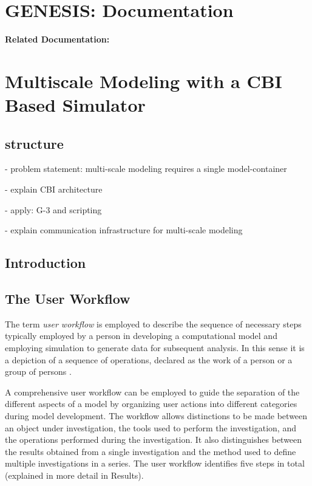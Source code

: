 \documentclass[12pt]{article}
\begin{document}
\section*{GENESIS: Documentation}

{\bf Related Documentation:}

\section*{Multiscale Modeling with a CBI Based Simulator}

\subsection*{structure}

- problem statement: multi-scale modeling requires a single model-container

- explain CBI architecture

- apply: G-3 and scripting

- explain communication infrastructure for multi-scale modeling


\subsection*{Introduction}

\subsection*{The User Workflow}

The term {\it user workflow} is employed to describe the sequence of
necessary steps typically employed by a person in developing a
computational model and employing simulation to generate data for
subsequent analysis. In this sense it is a depiction of a sequence of
operations, declared as the work of a person or a group of persons
\cite{Belhajjame:2001fv}.

A comprehensive user workflow can be employed to guide the separation
of the different aspects of a model by organizing user actions into
different categories during model development.  The workflow allows
distinctions to be made between an object under investigation, the
tools used to perform the investigation, and the operations performed
during the investigation. It also distinguishes between the results
obtained from a single investigation and the method used to define
multiple investigations in a series. The user workflow identifies five
steps in total (explained in more detail in Results).
\end{document}
